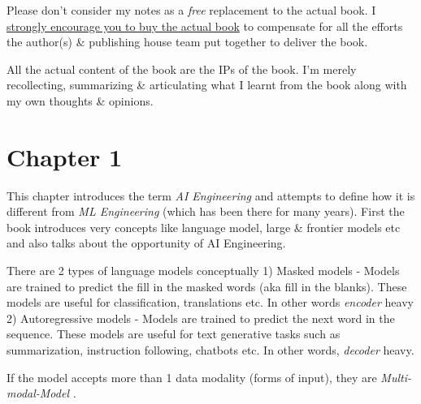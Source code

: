 \documentclass[
  letterpaper,
  DIV=11,
  numbers=noendperiod]{scrreprt}
\begin{document}
\begin{tcolorbox}[enhanced jigsaw, leftrule=.75mm, breakable, colframe=quarto-callout-caution-color-frame, bottomrule=.15mm, opacityback=0, arc=.35mm, colback=white, rightrule=.15mm, toprule=.15mm, left=2mm]
\begin{minipage}[t]{5.5mm}
\textcolor{quarto-callout-caution-color}{\faFire}
\end{minipage}%
\begin{minipage}[t]{\textwidth - 5.5mm}

Please don't consider my notes as a \emph{free} replacement to the
actual book. I \ul{strongly encourage you to buy the actual book} to
compensate for all the efforts the author(s) \& publishing house team
put together to deliver the book.

All the actual content of the book are the IPs of the book. I'm merely
recollecting, summarizing \& articulating what I learnt from the book
along with my own thoughts \& opinions.

\end{minipage}%
\end{tcolorbox}


\chapter*{Chapter 1}\label{chapter-1}


This chapter introduces the term \emph{AI Engineering} and attempts to
define how it is different from \emph{ML Engineering} (which has been
there for many years). First the book introduces very concepts like
language model, large \& frontier models etc and also talks about the
opportunity of AI Engineering.

There are 2 types of language models conceptually 1) Masked models -
Models are trained to predict the fill in the masked words (aka fill in
the blanks). These models are useful for classification, translations
etc. In other words \emph{encoder} heavy 2) Autoregressive models -
Models are trained to predict the next word in the sequence. These
models are useful for text generative tasks such as summarization,
instruction following, chatbots etc. In other words, \emph{decoder}
heavy.

If the model accepts more than 1 data modality (forms of input), they
are \emph{Multi-modal-Model} .
\end{document}
